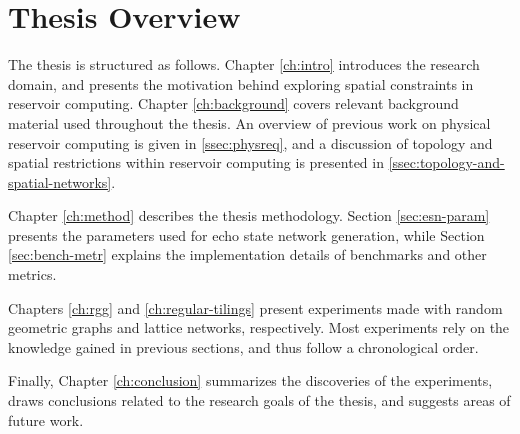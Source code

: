 \section{Thesis Overview}

The thesis is structured as follows. Chapter \ref{ch:intro} introduces the
research domain, and presents the motivation behind exploring spatial
constraints in reservoir computing. Chapter \ref{ch:background} covers relevant
background material used throughout the thesis. An overview of previous work on
physical reservoir computing is given in \ref{ssec:physreq}, and a discussion of
topology and spatial restrictions within reservoir computing is presented in
\ref{ssec:topology-and-spatial-networks}.

Chapter \ref{ch:method} describes the thesis methodology. Section
\ref{sec:esn-param} presents the parameters used for echo state network
generation, while Section \ref{sec:bench-metr} explains the implementation
details of benchmarks and other metrics.

Chapters \ref{ch:rgg} and \ref{ch:regular-tilings} present experiments made with
random geometric graphs and lattice networks, respectively. Most experiments
rely on the knowledge gained in previous sections, and thus follow a
chronological order.

Finally, Chapter \ref{ch:conclusion} summarizes the discoveries of the
experiments, draws conclusions related to the research goals of the thesis, and
suggests areas of future work.

